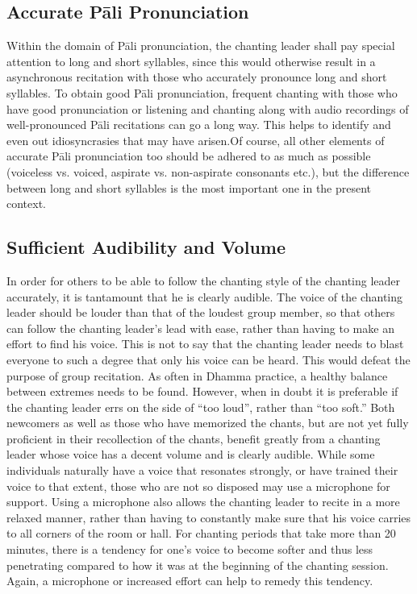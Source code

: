 \ifbfive\vspace{-0.1cm}\fi

\subsection*{Accurate Pāli Pronunciation}

  Within the domain of Pāli pronunciation, the chanting leader shall pay special attention to long and short syllables, since this would otherwise result in a asynchronous recitation with those who accurately pronounce long and short syllables. To obtain good Pāli pronunciation, frequent chanting with those who have good pronunciation or listening and chanting along with audio recordings of well-pronounced Pāli recitations can go a long way. This helps to identify and even out idiosyncrasies that may have arisen.\ifbfive\clearpage\fi Of course, all other elements of accurate Pāli pronunciation too should be adhered to as much as possible (voiceless vs. voiced, aspirate vs. non-aspirate consonants etc.), but the difference between long and short syllables is the most important one in the present context.

\subsection*{Sufficient Audibility and Volume}

  In order for others to be able to follow the chanting style of the chanting leader accurately, it is tantamount that he is clearly audible. The voice of the chanting leader should be louder than that of the loudest group member, so that others can follow the chanting leader's lead with ease, rather than having to make an effort to find his voice. This is not to say that the chanting leader needs to blast everyone to such a degree that only his voice can be heard. This would defeat the purpose of group recitation. As often in Dhamma practice, a healthy balance between extremes needs to be found. However, when in doubt it is preferable if the chanting leader errs on the side of ``too loud'', rather than ``too soft.'' Both newcomers as well as those who have memorized the chants, but are not yet fully proficient in their recollection of the chants, benefit greatly from a chanting leader whose voice has a decent volume and is clearly audible. While some individuals naturally have a voice that resonates strongly, or have trained their voice to that extent, those who are not so disposed may use a microphone for support. Using a microphone also allows the chanting leader to recite in a more relaxed manner, rather than having to constantly make sure that his voice carries to all corners of the room or hall. For chanting periods that take more than 20 minutes, there is a tendency for one's voice to become softer and thus less penetrating compared to how it was at the beginning of the chanting session. Again, a microphone or increased effort can help to remedy this tendency.

